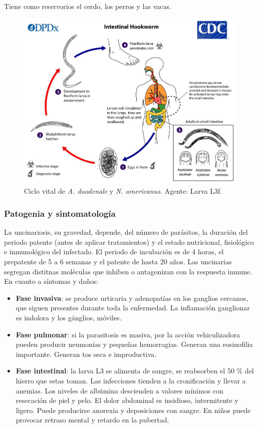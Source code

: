 Tiene como reservorios el cerdo, los perros y las vacas.
\begin{figure}[H]
	\centering
	\includegraphics[width=0.7\columnwidth]{A.imagenes/ACV-BioSan-ParasitAduodenaleNamericanusCBios}
	\caption[Ciclo vital de \textit{A. duodenale} y \textit{N. americanus}]{Ciclo vital de \textit{A. duodenale} y \textit{N. americanus}. Agente: Larva L3f.\label{fig:PARASIT:AduodenaleNamericanusCBios}}
\end{figure}
\subsubsection{Patogenia y sintomatología}
La uncinariosis, su gravedad, depende, del número de parásitos, la duración del periodo patente (antes de aplicar tratamientos) y el estado nutricional, fisiológico e inmunológico del infectado. El periodo de incubación es de 4 horas, el prepatente de 5 a 6 semanas y el patente de hasta 20 años. Las uncinarias segregan distitnas moléculas que inhiben o antagonizan con la respuesta inmune. En cuanto a síntomas y daños:
\begin{itemize}[itemsep=0pt,parsep=0pt,topsep=0pt,partopsep=0pt]
	\item\textbf{Fase invasiva}: se produce urticaria y adenopatías en los ganglios cercanos, que siguen presentes durante toda la enfermedad. La inflamación ganglionar es indolora y los gánglios, móviles.
	\item\textbf{Fase pulmonar}: si la parasitosis es masiva, por la acción vehiculizadora pueden producir neumonías y pequeñas hemorragias. Generan una eosinofilia importante. Generan tos seca e improductiva.
	\item\textbf{Fase intestinal}: la larva L3 se alimenta de sangre, se reabsorben el 50 \% del hierro que estas toman. Las infecciones tienden a la cronificación y llevar a anemias. Los niveles de albúmina descienden a valores mínimos con resecación de piel y pelo. El dolor abdominal es insidioso, intermitente y ligero. Puede producirse anorexia y deposiciones con sangre. En niños puede provocar retraso mental y retardo en la pubertad.
\end{itemize}
